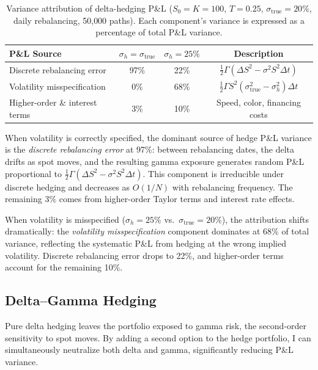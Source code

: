 \documentclass[11pt,a4paper]{article}
\begin{document}
\begin{table}[H]
    \centering
    \caption{Variance attribution of delta-hedging P\&L ($S_0 = K = 100$, $T = 0.25$, $\sigma_{\text{true}} = 20\%$, daily rebalancing, 50{,}000 paths). Each component's variance is expressed as a percentage of total P\&L variance.}
    \label{tab:pnl_attribution}
    \begin{tabular}{lccc}
        \toprule
        \textbf{P\&L Source} & \textbf{$\sigma_h = \sigma_{\text{true}}$} & \textbf{$\sigma_h = 25\%$} & \textbf{Description} \\
        \midrule
        Discrete rebalancing error & 97\% & 22\% & $\frac{1}{2}\Gamma(\Delta S^2 - \sigma^2 S^2 \Delta t)$ \\
        Volatility misspecification & 0\% & 68\% & $\frac{1}{2}\Gamma S^2(\sigma_{\text{true}}^2 - \sigma_h^2)\Delta t$ \\
        Higher-order \& interest terms & 3\% & 10\% & Speed, color, financing costs \\
        \bottomrule
    \end{tabular}
\end{table}

When volatility is correctly specified, the dominant source of hedge P\&L variance is the \emph{discrete rebalancing error} at 97\%: between rebalancing dates, the delta drifts as spot moves, and the resulting gamma exposure generates random P\&L proportional to $\frac{1}{2}\Gamma(\Delta S^2 - \sigma^2 S^2 \Delta t)$. This component is irreducible under discrete hedging and decreases as $O(1/N)$ with rebalancing frequency. The remaining 3\% comes from higher-order Taylor terms and interest rate effects.

When volatility is misspecified ($\sigma_h = 25\%$ vs.\ $\sigma_{\text{true}} = 20\%$), the attribution shifts dramatically: the \emph{volatility misspecification} component dominates at 68\% of total variance, reflecting the systematic P\&L from hedging at the wrong implied volatility. Discrete rebalancing error drops to 22\%, and higher-order terms account for the remaining 10\%.


\subsection{Delta--Gamma Hedging}\label{subsec:delta_gamma_hedge}

Pure delta hedging leaves the portfolio exposed to gamma risk, the second-order sensitivity to spot moves. By adding a second option to the hedge portfolio, I can simultaneously neutralize both delta and gamma, significantly reducing P\&L variance.
\end{document}
